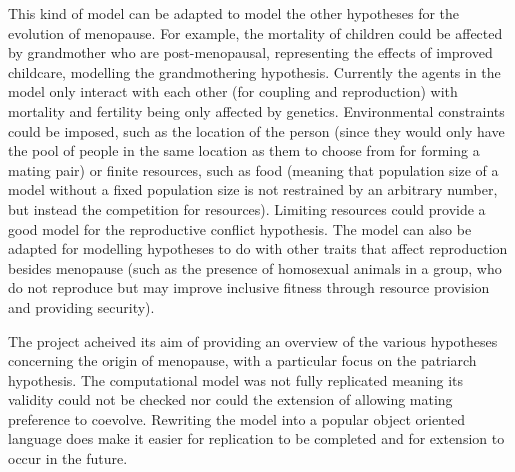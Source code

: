 \documentclass[authoryearcitations]{UoYCSproject}
\begin{document}
This kind of model can be adapted to model the other hypotheses for the evolution of menopause. For example, the mortality of children could be affected by grandmother who are post-menopausal, representing the effects of improved childcare, modelling the grandmothering hypothesis. Currently the agents in the model only interact with each other (for coupling and reproduction) with mortality and fertility being only affected by genetics. Environmental constraints could be imposed, such as the location of the person (since they would only have the pool of people in the same location as them to choose from for forming a mating pair) or finite resources, such as food (meaning that population size of a model without a fixed population size is not restrained by an arbitrary number, but instead the competition for resources). Limiting resources could provide a good model for the reproductive conflict hypothesis. The model can also be adapted for modelling hypotheses to do with other traits that affect reproduction besides menopause (such as the presence of homosexual animals in a group, who do not reproduce but may improve inclusive fitness through resource provision and providing security). 

The project acheived its aim of providing an overview of the various hypotheses concerning the origin of menopause, with a particular focus on the patriarch hypothesis. The computational model \cite{mateChoice2013} was not fully replicated meaning its validity could not be checked nor could the extension of allowing mating preference to coevolve. Rewriting the model into a popular object oriented language does make it easier for replication to be completed and for extension to occur in the future. 



 
\end{document}

